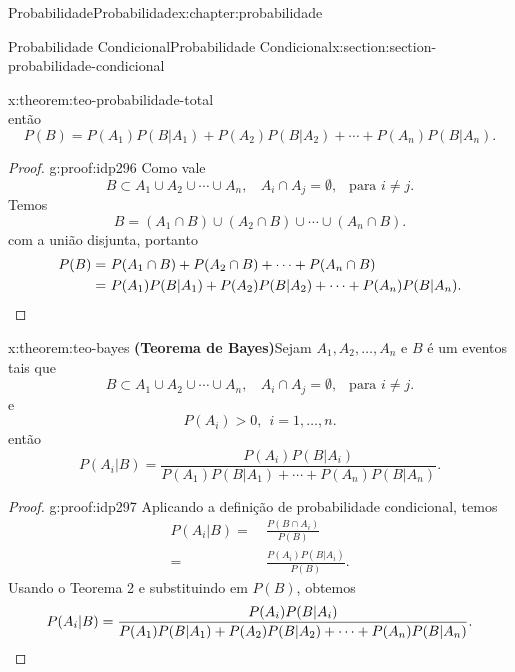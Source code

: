 \documentclass[oneside,10pt,]{book}
\newcommand{\terminology}[1]{\textbf{#1}}
\newcommand{\qedhere}{\relax}
\numberwithin{equation}{section}
\newcommand{\amp}{&}
\begin{document}
\begin{chapterptx}{Probabilidade}{}{Probabilidade}{}{}{x:chapter:probabilidade}
\begin{sectionptx}{Probabilidade Condicional}{}{Probabilidade Condicional}{}{}{x:section:section-probabilidade-condicional}
\begin{theorem}{}{}{x:theorem:teo-probabilidade-total}
\begin{equation*}
\end{equation*}
então%
\begin{equation*}
P(B) = P(A_1)P(B|A_1) + P(A_2)P(B|A_2)+\cdots + P(A_n)P(B|A_n). 
\end{equation*}
%
\end{theorem}
\begin{proof}{}{g:proof:idp296}
Como vale%
\begin{equation*}
B\subset A_1\cup A_2\cup\cdots \cup A_n, ~~~~ A_i\cap A_j = \emptyset, ~~\text{ para } i\neq j. 
\end{equation*}
Temos%
\begin{equation*}
B = (A_1\cap B) \cup (A_2\cap B) \cup \cdots \cup (A_n\cap B). 
\end{equation*}
com a união disjunta, portanto%
\begin{align*}
P(B) = \amp ~ P(A_1\cap B) + P(A_2\cap B) + \cdots + P(A_n\cap B) \\
= \amp ~ P(A_1)P(B|A_1)+ P(A_2)P(B|A_2)+\cdots + P(A_n)P(B|A_n).\qedhere
\end{align*}
%
\end{proof}
\begin{theorem}{}{}{x:theorem:teo-bayes}%
\terminology{(Teorema de Bayes)}Sejam \(A_1, A_2, \ldots, A_n\) e \(B\) é um eventos tais que%
\begin{equation*}
B\subset A_1\cup A_2\cup\cdots \cup A_n, ~~~~ A_i\cap A_j = \emptyset, ~~\text{ para } i\neq j. 
\end{equation*}
e%
\begin{equation*}
P(A_i)>0,~~ i = 1, \ldots, n.  
\end{equation*}
então%
\begin{equation*}
P(A_i|B) = \frac{P(A_i)P(B|A_i)}{P(A_1)P(B|A_1)+\cdots +P(A_n)P(B|A_n)}. 
\end{equation*}
%
\end{theorem}
\begin{proof}{}{g:proof:idp297}
Aplicando a definição de probabilidade condicional, temos%
\begin{align*}
P(A_i|B) = \amp ~ \frac{P(B\cap A_i)}{P(B)} \\
= \amp ~ \frac{P(A_i)P(B|A_i)}{P(B)}.
\end{align*}
Usando o Teorema 2 e substituindo em \(P(B)\), obtemos%
\begin{equation*}
P(A_i|B) = \frac{P(A_i)P(B|A_i)}{P(A_1)P(B|A_1)+ P(A_2)P(B|A_2)+\cdots + P(A_n)P(B|A_n)}.\qedhere
\end{equation*}
%
\end{proof}

\end{sectionptx}
\end{chapterptx}
\end{document}
